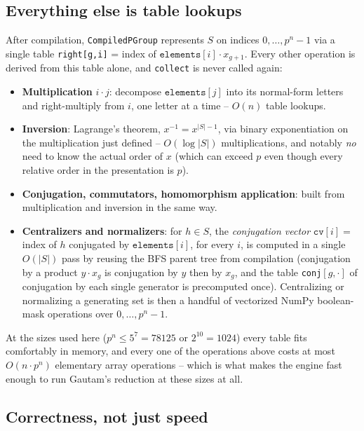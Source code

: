 \documentclass[11pt]{article}
\theoremstyle{remark}
\begin{document}
\subsection{Everything else is table lookups}

After compilation, \texttt{CompiledPGroup} represents $S$ on indices
$0,\dots,p^n-1$ via a single table \texttt{right[g,i]} = index of
$\texttt{elements}[i]\cdot x_{g+1}$. Every other operation is derived from
this table alone, and \texttt{collect} is never called again:
\begin{itemize}[nosep]
  \item \textbf{Multiplication} $i \cdot j$: decompose $\texttt{elements}[j]$
    into its normal-form letters and right-multiply from $i$, one letter at
    a time -- $O(n)$ table lookups.
  \item \textbf{Inversion}: Lagrange's theorem, $x^{-1} = x^{|S|-1}$, via
    binary exponentiation on the multiplication just defined -- $O(\log|S|)$
    multiplications, and notably \emph{no} need to know the actual order of
    $x$ (which can exceed $p$ even though every relative order in the
    presentation is $p$).
  \item \textbf{Conjugation, commutators, homomorphism application}: built
    from multiplication and inversion in the same way.
  \item \textbf{Centralizers and normalizers}: for $h \in S$, the
    \emph{conjugation vector} $\texttt{cv}[i] = $ index of $h$ conjugated by
    $\texttt{elements}[i]$, for every $i$, is computed in a single $O(|S|)$
    pass by reusing the BFS parent tree from compilation (conjugation by a
    product $y\cdot x_g$ is conjugation by $y$ then by $x_g$, and the table
    \texttt{conj}$[g,\cdot]$ of conjugation by each single generator is
    precomputed once). Centralizing or normalizing a generating set is then
    a handful of vectorized NumPy boolean-mask operations over $0,\dots,p^n-1$.
\end{itemize}
At the sizes used here ($p^n \le 5^7 = 78125$ or $2^{10}=1024$) every table
fits comfortably in memory, and every one of the operations above costs at
most $O(n \cdot p^n)$ elementary array operations -- which is what makes the
engine fast enough to run Gautam's reduction at these sizes at all.

\subsection{Correctness, not just speed}
\end{document}
